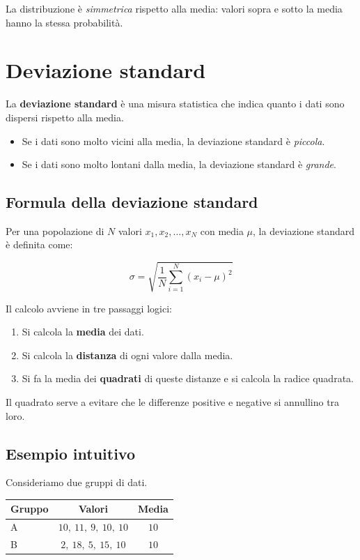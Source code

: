 \documentclass[12pt, a4paper]{article}
\begin{document}
La distribuzione è \emph{simmetrica} rispetto alla media: valori sopra e sotto la media hanno la stessa probabilità.

\section{Deviazione standard}

La \textbf{deviazione standard} è una misura statistica che indica quanto i dati sono dispersi rispetto alla media.

\begin{itemize}
  \item Se i dati sono molto vicini alla media, la deviazione standard è \emph{piccola}.
  \item Se i dati sono molto lontani dalla media, la deviazione standard è \emph{grande}.
\end{itemize}

\subsection{Formula della deviazione standard}

Per una popolazione di $N$ valori $x_1, x_2, \ldots, x_N$ con media $\mu$, la deviazione standard è definita come:

\[
  \sigma = \sqrt{\dfrac{1}{N} \sum_{i=1}^{N} (x_i - \mu)^2}
\]

Il calcolo avviene in tre passaggi logici:

\begin{enumerate}
  \item Si calcola la \textbf{media} dei dati.
  \item Si calcola la \textbf{distanza} di ogni valore dalla media.
  \item Si fa la media dei \textbf{quadrati} di queste distanze e si calcola la radice quadrata.
\end{enumerate}

Il quadrato serve a evitare che le differenze positive e negative si annullino tra loro.

\subsection{Esempio intuitivo}

Consideriamo due gruppi di dati.

\begin{center}
\begin{tabular}{lcc}
\toprule
\textbf{Gruppo} & \textbf{Valori} & \textbf{Media} \\
\midrule
A & $10,\ 11,\ 9,\ 10,\ 10$ & $10$ \\
B & $2,\ 18,\ 5,\ 15,\ 10$  & $10$ \\
\bottomrule
\end{tabular}
\end{center}
\end{document}
